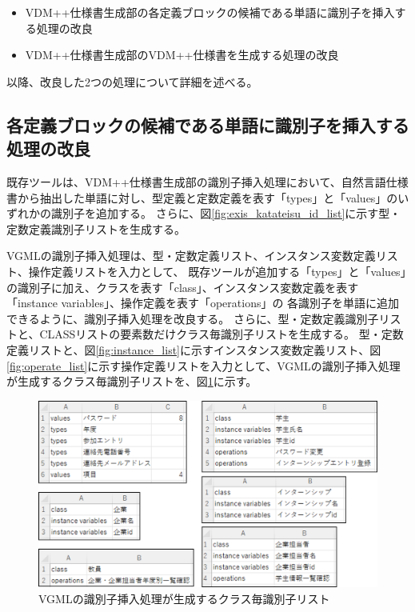 \begin{itemize}
    \item VDM++仕様書生成部の各定義ブロックの候補である単語に識別子を挿入する処理の改良
    \item VDM++仕様書生成部のVDM++仕様書を生成する処理の改良
\end{itemize}

以降、改良した2つの処理について詳細を述べる。

\subsection{各定義ブロックの候補である単語に識別子を挿入する処理の改良}
既存ツールは、VDM++仕様書生成部の識別子挿入処理において、自然言語仕様書から抽出した単語に対し、型定義と定数定義を表す「types」と「values」のいずれかの識別子を追加する。
さらに、図\ref{fig:exis_katateisu_id_list}に示す型・定数定義識別子リストを生成する。

VGMLの識別子挿入処理は、型・定数定義リスト、インスタンス変数定義リスト、操作定義リストを入力として、
既存ツールが追加する「types」と「values」の識別子に加え、クラスを表す「class」、インスタンス変数定義を表す「instance variables」、操作定義を表す「operations」の
各識別子を単語に追加できるように、識別子挿入処理を改良する。
さらに、型・定数定義識別子リストと、CLASSリストの要素数だけクラス毎識別子リストを生成する。
型・定数定義リストと、図\ref{fig:instance_list}に示すインスタンス変数定義リスト、図\ref{fig:operate_list}に示す操作定義リストを入力として、VGMLの識別子挿入処理が生成するクラス毎識別子リストを、図\ref{fig:vgml_sikibetushi_list}に示す。

\begin{figure}[t]
    \begin{center}
        \includegraphics[width=1.0\columnwidth]{image/vgml_sikibetushi_list.png}
        \caption{VGMLの識別子挿入処理が生成するクラス毎識別子リスト}
        \label{fig:vgml_sikibetushi_list}
    \end{center}
\end{figure}

